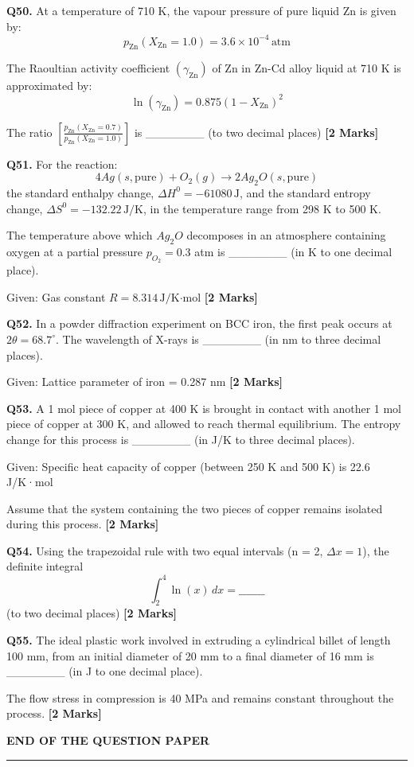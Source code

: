 \documentclass[11pt]{article}
\newcommand{\questionb}[2]{
    \noindent\textbf{Q#2.} #1 \hfill \textbf{[2 Marks]}
}
\begin{document}
\questionb{At a temperature of 710 K, the vapour pressure of pure liquid Zn is given by:  
\[ p_{\text{Zn}}(X_{\text{Zn}} = 1.0) = 3.6 \times 10^{-4}\, \text{atm} \]  

The Raoultian activity coefficient \((\gamma_{\text{Zn}})\) of Zn in Zn-Cd alloy liquid at 710 K is approximated by:  
\[
\ln(\gamma_{\text{Zn}}) = 0.875(1 - X_{\text{Zn}})^2
\]

The ratio \( \left[ \frac{p_{\text{Zn}}(X_{\text{Zn}} = 0.7)}{p_{\text{Zn}}(X_{\text{Zn}} = 1.0)} \right] \) is \_\_\_\_\_\_\_ (to two decimal places)}{50}
\vspace{0.5cm}

\questionb{For the reaction:  
\[ 4Ag(s, \text{pure}) + O_2(g) \rightarrow 2Ag_2O(s, \text{pure}) \]  
the standard enthalpy change, \(\Delta H^0 = -61080\, \text{J}\), and the standard entropy change, \(\Delta S^0 = -132.22\, \text{J/K}\), in the temperature range from 298 K to 500 K.  

The temperature above which \(Ag_2O\) decomposes in an atmosphere containing oxygen at a partial pressure \(p_{O_2} = 0.3\) atm is \_\_\_\_\_\_\_ (in K to one decimal place).  

Given: Gas constant \(R = 8.314\, \text{J/K·mol}\)}{51}
\vspace{0.5cm}

\questionb{In a powder diffraction experiment on BCC iron, the first peak occurs at \(2\theta = 68.7^\circ\). The wavelength of X-rays is \_\_\_\_\_\_\_ (in nm to three decimal places).  

Given: Lattice parameter of iron = 0.287 nm}{52}
\vspace{0.5cm}

\questionb{A 1 mol piece of copper at 400 K is brought in contact with another 1 mol piece of copper at 300 K, and allowed to reach thermal equilibrium. The entropy change for this process is \_\_\_\_\_\_\_ (in J/K to three decimal places).  

Given: Specific heat capacity of copper (between 250 K and 500 K) is 22.6 J/K·mol  

Assume that the system containing the two pieces of copper remains isolated during this process.}{53}
\vspace{0.5cm}

\questionb{Using the trapezoidal rule with two equal intervals (n = 2, \(\Delta x = 1\)), the definite integral  
\[
\int_{2}^{4} \ln(x) \, dx = \_\_\_\_\_\_\_
\]  
(to two decimal places)}{54}
\vspace{0.5cm}

\questionb{The ideal plastic work involved in extruding a cylindrical billet of length 100 mm, from an initial diameter of 20 mm to a final diameter of 16 mm is \_\_\_\_\_\_\_ (in J to one decimal place).  

The flow stress in compression is 40 MPa and remains constant throughout the process.}{55}
\vspace{0.5cm}

\vspace{5cm}
\begin{center}
\textbf{END OF THE QUESTION PAPER} \\
\rule{\textwidth}{0.5pt}
\end{center}
\end{document}
